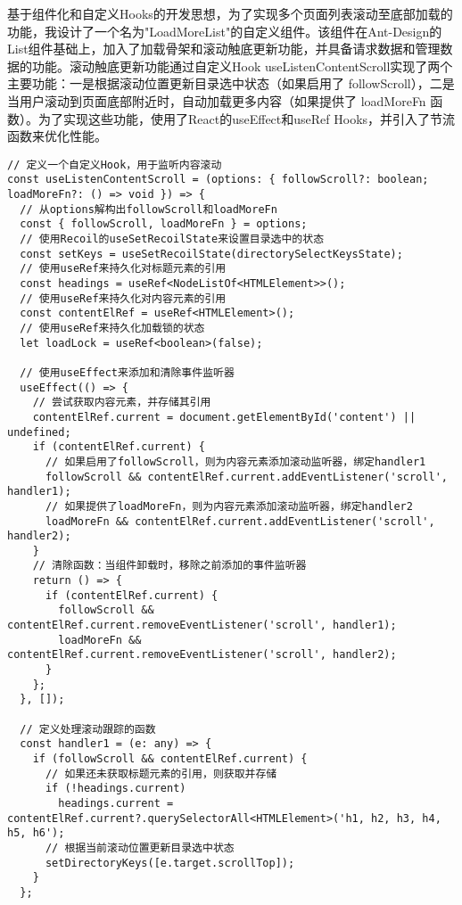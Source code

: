 \documentclass[12pt,a4paper]{article}
\begin{document}
\begin{CJK*}{UTF8}{gbsn}
基于组件化和自定义Hooks的开发思想，为了实现多个页面列表滚动至底部加载的功能，我设计了一个名为"LoadMoreList"的自定义组件。该组件在Ant-Design的List组件基础上，加入了加载骨架和滚动触底更新功能，并具备请求数据和管理数据的功能。滚动触底更新功能通过自定义Hook useListenContentScroll实现了两个主要功能：一是根据滚动位置更新目录选中状态（如果启用了 followScroll），二是当用户滚动到页面底部附近时，自动加载更多内容（如果提供了 loadMoreFn 函数）。为了实现这些功能，使用了React的useEffect和useRef Hooks，并引入了节流函数来优化性能。

\begin{mdframed}
\begin{verbatim}
// 定义一个自定义Hook，用于监听内容滚动
const useListenContentScroll = (options: { followScroll?: boolean; loadMoreFn?: () => void }) => {
  // 从options解构出followScroll和loadMoreFn
  const { followScroll, loadMoreFn } = options;
  // 使用Recoil的useSetRecoilState来设置目录选中的状态
  const setKeys = useSetRecoilState(directorySelectKeysState);
  // 使用useRef来持久化对标题元素的引用
  const headings = useRef<NodeListOf<HTMLElement>>();
  // 使用useRef来持久化对内容元素的引用
  const contentElRef = useRef<HTMLElement>();
  // 使用useRef来持久化加载锁的状态
  let loadLock = useRef<boolean>(false);

  // 使用useEffect来添加和清除事件监听器
  useEffect(() => {
    // 尝试获取内容元素，并存储其引用
    contentElRef.current = document.getElementById('content') || undefined;
    if (contentElRef.current) {
      // 如果启用了followScroll，则为内容元素添加滚动监听器，绑定handler1
      followScroll && contentElRef.current.addEventListener('scroll', handler1);
      // 如果提供了loadMoreFn，则为内容元素添加滚动监听器，绑定handler2
      loadMoreFn && contentElRef.current.addEventListener('scroll', handler2);
    }
    // 清除函数：当组件卸载时，移除之前添加的事件监听器
    return () => {
      if (contentElRef.current) {
        followScroll && contentElRef.current.removeEventListener('scroll', handler1);
        loadMoreFn && contentElRef.current.removeEventListener('scroll', handler2);
      }
    };
  }, []);

  // 定义处理滚动跟踪的函数
  const handler1 = (e: any) => {
    if (followScroll && contentElRef.current) {
      // 如果还未获取标题元素的引用，则获取并存储
      if (!headings.current)
        headings.current = contentElRef.current?.querySelectorAll<HTMLElement>('h1, h2, h3, h4, h5, h6');
      // 根据当前滚动位置更新目录选中状态
      setDirectoryKeys([e.target.scrollTop]);
    }
  };


\end{verbatim}
\end{mdframed}
\end{CJK*}
\end{document}
